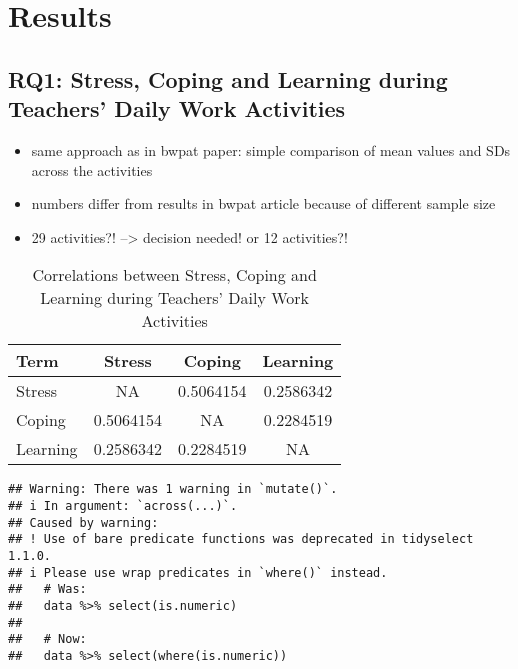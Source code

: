 \documentclass[
]{article}
\providecommand{\tightlist}{%
  \setlength{\itemsep}{0pt}\setlength{\parskip}{0pt}}
\begin{document}
\section{Results}\label{results}

\subsection{RQ1: Stress, Coping and Learning during Teachers' Daily Work
Activities}\label{rq1-stress-coping-and-learning-during-teachers-daily-work-activities}

\begin{itemize}
\tightlist
\item
  same approach as in bwpat paper: simple comparison of mean values and
  SDs across the activities
\item
  numbers differ from results in bwpat article because of different
  sample size
\item
  29 activities?! --\textgreater{} decision needed! or 12 activities?!
\end{itemize}

\begingroup\fontsize{9}{11}\selectfont

\begin{longtable}[t]{lccc}
\caption{\label{tab:rq1 correlations kable table}Correlations between Stress, Coping and Learning during Teachers' Daily Work Activities}\\
\toprule
Term & Stress & Coping & Learning\\
\midrule
Stress & NA & 0.5064154 & 0.2586342\\
Coping & 0.5064154 & NA & 0.2284519\\
Learning & 0.2586342 & 0.2284519 & NA\\
\bottomrule
\end{longtable}
\endgroup{}

\begin{verbatim}
## Warning: There was 1 warning in `mutate()`.
## i In argument: `across(...)`.
## Caused by warning:
## ! Use of bare predicate functions was deprecated in tidyselect 1.1.0.
## i Please use wrap predicates in `where()` instead.
##   # Was:
##   data %>% select(is.numeric)
## 
##   # Now:
##   data %>% select(where(is.numeric))
\end{verbatim}

\begingroup\fontsize{9}{11}\selectfont
\end{document}
